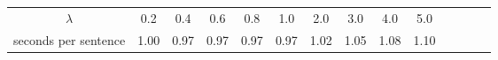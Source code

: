 \begin{tabular}{cccccccccccccc}
	$\lambda$ &
	0.2 &
	0.4 &
	0.6 &
	0.8 &
	1.0 &
	2.0 &
	3.0 &
	4.0 &
	5.0 \\
	seconds per sentence &
	1.00 &
	0.97 &
	0.97 &
	0.97 &
	0.97 &
	1.02 &
	1.05 &
	1.08 &
	1.10 \\
\end{tabular}